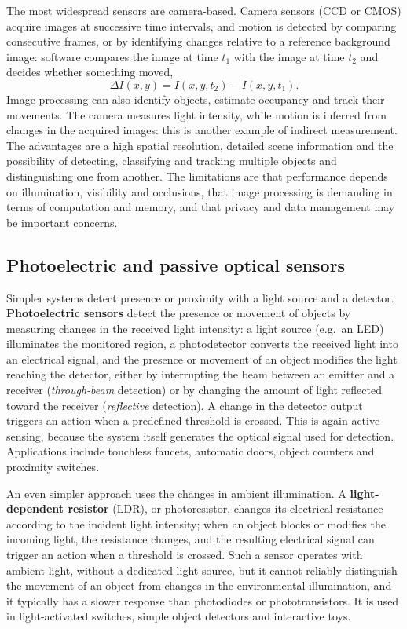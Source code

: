 \documentclass[letterpaper,11pt,leqno]{book}
\begin{document}
The most widespread sensors are camera-based. Camera sensors (CCD or CMOS) acquire images at successive time intervals, and motion is detected by comparing consecutive frames, or by identifying changes relative to a reference background image: software compares the image at time $t_1$ with the image at time $t_2$ and decides whether something moved,
\begin{equation}
\Delta I(x,y) = I(x,y,t_2) - I(x,y,t_1).
\end{equation}
Image processing can also identify objects, estimate occupancy and track their movements. The camera measures light intensity, while motion is inferred from changes in the acquired images: this is another example of indirect measurement. The advantages are a high spatial resolution, detailed scene information and the possibility of detecting, classifying and tracking multiple objects and distinguishing one from another. The limitations are that performance depends on illumination, visibility and occlusions, that image processing is demanding in terms of computation and memory, and that privacy and data management may be important concerns.

\subsection{Photoelectric and passive optical sensors}

Simpler systems detect presence or proximity with a light source and a detector. \textbf{Photoelectric sensors} detect the presence or movement of objects by measuring changes in the received light intensity: a light source (e.g.\ an LED) illuminates the monitored region, a photodetector converts the received light into an electrical signal, and the presence or movement of an object modifies the light reaching the detector, either by interrupting the beam between an emitter and a receiver (\emph{through-beam} detection) or by changing the amount of light reflected toward the receiver (\emph{reflective} detection). A change in the detector output triggers an action when a predefined threshold is crossed. This is again active sensing, because the system itself generates the optical signal used for detection. Applications include touchless faucets, automatic doors, object counters and proximity switches.

An even simpler approach uses the changes in ambient illumination. A \textbf{light-dependent resistor} (LDR), or photoresistor, changes its electrical resistance according to the incident light intensity; when an object blocks or modifies the incoming light, the resistance changes, and the resulting electrical signal can trigger an action when a threshold is crossed. Such a sensor operates with ambient light, without a dedicated light source, but it cannot reliably distinguish the movement of an object from changes in the environmental illumination, and it typically has a slower response than photodiodes or phototransistors. It is used in light-activated switches, simple object detectors and interactive toys.
\end{document}
